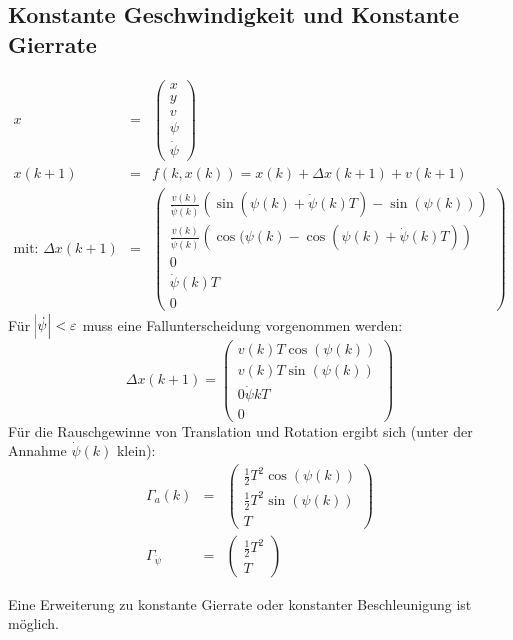\subsection{Konstante Geschwindigkeit und Konstante Gierrate}
\begin{eqnarray*}
    x &=&
        \begin{pmatrix}
            x \\ y \\ v \\ \psi \\ \dot{\psi}
        \end{pmatrix} \\
    x(k+1) &=& f(k, x(k)) = x(k) + \Delta x(k+1) + v(k+1) \\
    \text{mit: } \Delta x(k+1) &=& 
        \begin{pmatrix}
            \frac{v(k)}{\dot{\psi}(k)} \left(\sin(\psi(k) + \dot{\psi}(k) T) - \sin(\psi(k))\right) \\
            \frac{v(k)}{\dot{\psi}(k)} \left(\cos(\psi(k) - \cos(\psi(k) + \dot{\psi}(k) T) \right) \\
            0 \\
            \dot{\psi}(k) T \\
            0
        \end{pmatrix}
\end{eqnarray*}
Für $\abs{\dot{\psi}} < \varepsilon$ muss eine Fallunterscheidung vorgenommen werden:
\begin{equation*}
    \Delta x(k+1) = 
        \begin{pmatrix}
            v(k) T \cos(\psi(k)) \\
            v(k) T \sin(\psi(k)) \\
            0
            \dot{\psi}{k} T \\
            0
        \end{pmatrix}
\end{equation*}
Für die Rauschgewinne von Translation und Rotation ergibt sich (unter der Annahme $\dot{\psi}(k)$ klein):
\begin{eqnarray*}
    \Gamma_a(k) &=&
        \begin{pmatrix}
            \frac{1}{2} T^2 \cos(\psi(k)) \\
            \frac{1}{2} T^2 \sin(\psi(k)) \\
            T
        \end{pmatrix} \\
    \Gamma_{\ddot{\psi}} &=& 
        \begin{pmatrix}
            \frac{1}{2} T^2 \\
            T
        \end{pmatrix}
\end{eqnarray*}

Eine Erweiterung zu konstante Gierrate oder konstanter Beschleunigung ist möglich.
